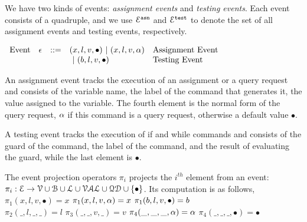 We have two kinds of events: \emph{assignment events} and \emph{testing events}. 
Each event consists of a quadruple,
and we use $\mathcal{E}^{\mathtt{{asn}}}$ and $\mathcal{E}^{\mathtt{{test}}}$ to denote the set of all assignment events and testing events, respectively.
\begin{center}
$ \begin{array}{lllll}
\mbox{Event} 
& \mathtt{\epsilon} & ::= & 
({x}, l, v, \bullet) ~|~ ({x}, l, v, \alpha) & \mbox{Assignment Event} \\
&&& ~|~(b, l, v, \bullet) & \mbox{Testing Event}
\\
\end{array}$
\end{center}
An assignment event tracks the execution of an assignment or a query request and consists of the variable name, the label of the command that generates it, the value assigned to the variable.
The fourth element is the normal form of the query request, $\alpha$ if this command is a query request, otherwise a default value $\bullet$.

A testing event tracks the execution of if and while commands and consists of the guard of the command, the label of the command, and the result of evaluating the guard, while the last element is $\bullet$.

The event projection operators $\pi_i$ projects the $i^{th}$ element from an event:
$ \pi_i : 
\mathcal{E} \to \mathcal{V} \cup \mathcal{B} \cup \mathcal{L} \cup \mathcal{VAL} \cup \mathcal{QD} \cup\{\bullet\} $.
Its computation is as follows,
\\
$\pi_1(x, l, v, \bullet) = x $ \qquad $\pi_1({x}, l, v, \alpha) = x$ \qquad $ \pi_1(b, l, v, \bullet) = b$
\\
$\pi_2(\_, l, \_, \_ ) = l$
\qquad
$\pi_3(\_, \_, v, \_) = v$
\qquad
$\pi_4(\_, \_, \_, \alpha) = \alpha$ \qquad $\pi_4(\_, \_, \_, \bullet) = \bullet$
